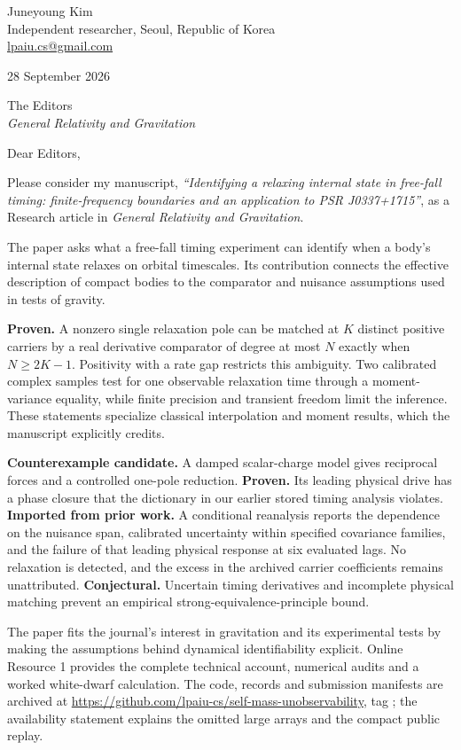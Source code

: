 \documentclass[11pt]{article}
\begin{document}
Juneyoung Kim\\
Independent researcher, Seoul, Republic of Korea\\
\href{mailto:lpaiu.cs@gmail.com}{lpaiu.cs@gmail.com}

28 September 2026

The Editors\\
\emph{General Relativity and Gravitation}

Dear Editors,

Please consider my manuscript, \emph{``Identifying a relaxing internal state in free-fall timing: finite-frequency boundaries and an application to PSR J0337+1715''}, as a Research article in \emph{General Relativity and Gravitation}.

The paper asks what a free-fall timing experiment can identify when a body's internal state relaxes on orbital timescales. Its contribution connects the effective description of compact bodies to the comparator and nuisance assumptions used in tests of gravity.

\textbf{Proven.} A nonzero single relaxation pole can be matched at $K$ distinct positive carriers by a real derivative comparator of degree at most $N$ exactly when $N\ge2K-1$. Positivity with a rate gap restricts this ambiguity. Two calibrated complex samples test for one observable relaxation time through a moment-variance equality, while finite precision and transient freedom limit the inference. These statements specialize classical interpolation and moment results, which the manuscript explicitly credits.

\textbf{Counterexample candidate.} A damped scalar-charge model gives reciprocal forces and a controlled one-pole reduction. \textbf{Proven.} Its leading physical drive has a phase closure that the dictionary in our earlier stored timing analysis violates. \textbf{Imported from prior work.} A conditional reanalysis reports the dependence on the nuisance span, calibrated uncertainty within specified covariance families, and the failure of that leading physical response at six evaluated lags. No relaxation is detected, and the excess in the archived carrier coefficients remains unattributed. \textbf{Conjectural.} Uncertain timing derivatives and incomplete physical matching prevent an empirical strong-equivalence-principle bound.

The paper fits the journal's interest in gravitation and its experimental tests by making the assumptions behind dynamical identifiability explicit. Online Resource 1 provides the complete technical account, numerical audits and a worked white-dwarf calculation. The code, records and submission manifests are archived at \url{https://github.com/lpaiu-cs/self-mass-unobservability}, tag ; the availability statement explains the omitted large arrays and the compact public replay.
\end{document}
